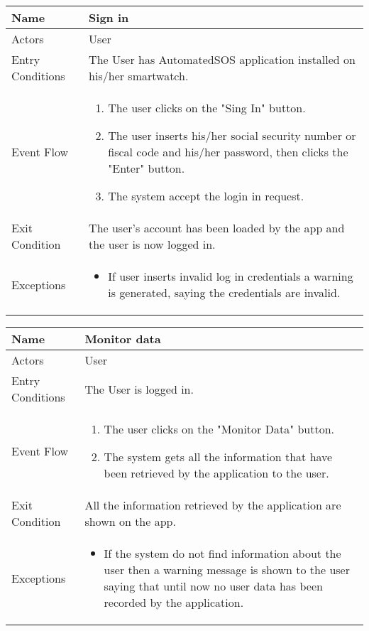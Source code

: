 \begin{table}[h]
\begin{tabular}{|l|l|}
\hline
Name             & Sign in \\ \hline
Actors           & User  \\ \hline
Entry Conditions & The User has AutomatedSOS application installed on his/her smartwatch.    \\ \hline
Event Flow       & \parbox{.45\textwidth}{\begin{enumerate}
            \item The user clicks on the "Sing In" button.
            \item The user inserts his/her social security number or fiscal code and his/her password, then clicks the "Enter" button.
            \item The system accept the login in request.
        \end{enumerate}}\\ \hline
Exit Condition   & The user's account has been loaded by the app and the user is now logged in.\\ \hline
Exceptions       & \parbox{.45\textwidth}  
{\begin{itemize}
\item If user inserts invalid log in credentials a warning is generated, saying the credentials are invalid.
\end{itemize}}\\ \hline
\end{tabular}
\end{table}

\begin{table}[h]
\begin{tabular}{|l|l|}
\hline
Name             & Monitor data \\ \hline
Actors           & User  \\ \hline
Entry Conditions & The User is logged in. \\ \hline
Event Flow       & \parbox{.45\textwidth}{\begin{enumerate}
            \item The user clicks on the "Monitor Data" button.
            \item The system gets all the information that have been retrieved by the application to the user.
\end{enumerate}}\\ \hline
Exit Condition   & All the information retrieved by the application are shown on the app.\\ \hline
Exceptions       & \parbox{.45\textwidth}  
{\begin{itemize}
\item If the system do not find information about the user then a warning message is shown to the user saying that until now no user data has been recorded by the application.
\end{itemize}}  \\ \hline
\end{tabular}
\end{table}

